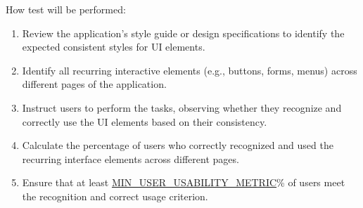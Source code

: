 \documentclass[12pt, titlepage]{article}
\begin{document}
\begin{enumerate}
How test will be performed:
\begin{enumerate}
    \item Review the application's style guide or design specifications to identify the expected consistent styles for UI elements.
    \item Identify all recurring interactive elements (e.g., buttons, forms, menus) across different pages of the application.
    \item Instruct users to perform the tasks, observing whether they recognize and correctly use the UI elements based on their consistency.
    \item Calculate the percentage of users who correctly recognized and used the recurring interface elements across different pages.
    \item Ensure that at least \hyperref[MIN_USER_USABILITY_METRIC]{MIN\_USER\_USABILITY\_METRIC}\% of users meet the recognition and correct usage criterion.
\end{enumerate}

\end{enumerate}

\end{document}
